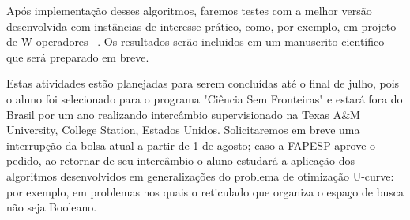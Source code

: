 \documentclass[12pt]{article}
\begin{document}
Após implementação desses algoritmos, faremos testes com a melhor versão desenvolvida com instâncias de interesse prático, como, por exemplo, em projeto de W-operadores ~\cite{msreis thesis}. Os resultados serão incluidos em um manuscrito científico que será preparado em breve.

\smallskip

Estas atividades estão planejadas para serem concluídas até o final de julho, pois o aluno foi selecionado para o programa "Ciência Sem Fronteiras" e estará fora do Brasil por um ano realizando intercâmbio supervisionado na Texas A\&M University, College Station, Estados Unidos. Solicitaremos em breve uma interrupção da bolsa atual a partir de 1 de agosto; caso a FAPESP aprove o pedido, ao retornar de seu intercâmbio o aluno estudará a aplicação dos algoritmos desenvolvidos em generalizações do problema de otimização U-curve: por exemplo, em problemas nos quais o reticulado que organiza o espaço de busca não seja Booleano.









\pagebreak
\end{document}
